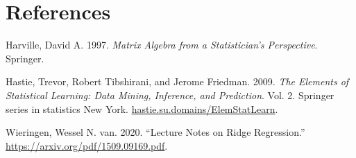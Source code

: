 \documentclass[
  letterpaper,
  DIV=11,
  numbers=noendperiod]{scrartcl}
\newlength{\cslhangindent}
\newlength{\cslentryspacingunit} %
\newenvironment{CSLReferences}[2] %
 {%
  \setlength{\parindent}{0pt}
  \ifodd #1
  \let\oldpar\par
  \def\par{\hangindent=\cslhangindent\oldpar}
  \fi
  \setlength{\parskip}{#2\cslentryspacingunit}
 }%
 {}
\begin{document}
\hypertarget{references}{%
\section{References}\label{references}}

\hypertarget{refs}{}
\begin{CSLReferences}{1}{0}
\leavevmode{}%
Harville, David A. 1997. \emph{Matrix Algebra from a Statistician's
Perspective}. Springer.

\leavevmode{}%
Hastie, Trevor, Robert Tibshirani, and Jerome Friedman. 2009. \emph{The
Elements of Statistical Learning: Data Mining, Inference, and
Prediction}. Vol. 2. Springer series in statistics New York.
\href{https://hastie.su.domains/ElemStatLearn}{hastie.su.domains/ElemStatLearn}.

\leavevmode{}%
Wieringen, Wessel N. van. 2020. {``Lecture Notes on Ridge Regression.''}
\url{https://arxiv.org/pdf/1509.09169.pdf}.

\end{CSLReferences}
\end{document}
